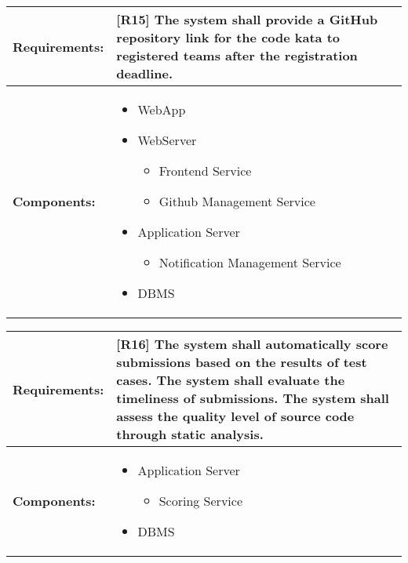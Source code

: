 \begin{table}[!ht]
    \centering
    {\renewcommand{\arraystretch}{2} %
    \setlength{\tabcolsep}{0.5em} %
    \begin{tabularx}{\textwidth}{|l|X|}
    \hline
       \textbf{Requirements:} & [R15] The system shall provide a GitHub repository link for the code kata to registered teams after the registration deadline.
       \\ \hline
        \textbf{Components:} & 
        \begin{minipage} [t] {0.4\textwidth} 
      \begin{itemize}
      \item WebApp
      \item WebServer
        \begin{itemize}
            \item Frontend Service
            \item Github Management Service
        \end{itemize}
      \item Application Server
        \begin{itemize}
            \item Notification Management Service
        \end{itemize}
      \item DBMS
     \end{itemize} 
    \end{minipage} \\ [2pt]  \hline
    \end{tabularx}} \quad
\end{table}

\begin{table}[!ht]
    \centering
    {\renewcommand{\arraystretch}{2} %
    \setlength{\tabcolsep}{0.5em} %
    \begin{tabularx}{\textwidth}{|l|X|}
    \hline
       \textbf{Requirements:} & [R16] The system shall automatically score submissions based on the results of test cases.  \newline
       [R17] The system shall evaluate the timeliness of submissions. \newline
       [R18] The system shall assess the quality level of source code through static analysis.
       \\ \hline
        \textbf{Components:} & 
        \begin{minipage} [t] {0.4\textwidth} 
      \begin{itemize}
      \item Application Server
        \begin{itemize}
            \item Scoring Service
        \end{itemize}
      \item DBMS
     \end{itemize} 
    \end{minipage} \\ [2pt]  \hline
    \end{tabularx}} \quad
\end{table}

